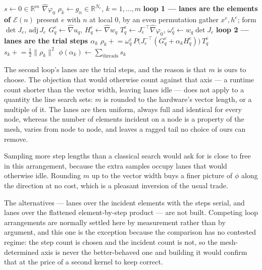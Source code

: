 \documentclass[11pt]{article}
\newcommand{\R}{\mathbb{R}}
\begin{document}
\begin{algorithm}
\caption{Residual merit at $m$ trial steps: one node, two vector loops}
\label{alg:kernel}
\begin{algorithmic}[1]
\State $s \gets 0 \in \R^{m}$ 
\State $\widehat\nabla\varphi_0$ 
  \State $\rho_k \gets g_n \in \R^{N_c}$, $k=1,\dots,m$ 
  \Statex \textbf{loop 1 --- lanes are the elements of $\mathcal{E}(n)$}
    \State present $e$ with $n$ at local $0$, by an even permutation
    \State gather $x^e,h^e$; form $\det J_e$, $\mathrm{adj}\,J_e$
      \State $G^e_q \gets \widehat\nabla u_q$, \; $H^e_q \gets \widehat\nabla w_q$
      \State $T^e_q \gets J_e^{-\top}\widehat\nabla\varphi_0$, \;
             $\omega^e_q \gets w_q \det J_e$
    \EndFor
  \EndFor
  \Statex \textbf{loop 2 --- lanes are the trial steps $\alpha_k$}
      \State $\rho_k \mathrel{+}= \omega^e_q \,
             P\bigl(J_e^{-\top}(G^e_q + \alpha_k H^e_q)\bigr)\, T^e_q$
    \EndFor
    \State $s_k \mathrel{+}= \tfrac12 \|\rho_k\|^2$ 
  \EndFor
\EndFor
\State $\phi(\alpha_k) \gets \sum_{\text{threads}} s_k$
\end{algorithmic}
\end{algorithm}

The second loop's lanes are the trial steps, and the reason is that $m$ is ours
to choose.  The objection that would otherwise count against that axis --- a
runtime count shorter than the vector width, leaving lanes idle --- does not
apply to a quantity the line search sets: $m$ is rounded to the hardware's
vector length, or a multiple of it.  The lanes are then uniform, always full and
identical for every node, whereas the number of elements incident on a node is a
property of the mesh, varies from node to node, and leaves a ragged tail no
choice of ours can remove.

Sampling more step lengths than a classical search would ask for is close to
free in this arrangement, because the extra samples occupy lanes that would
otherwise idle.  Rounding $m$ up to the vector width buys a finer picture of
$\phi$ along the direction at no cost, which is a pleasant inversion of the
usual trade.

The alternatives --- lanes over the incident elements with the steps serial, and
lanes over the flattened element-by-step product --- are not built.  Competing
loop arrangements are normally settled here by measurement rather than by
argument, and this one is the exception because the comparison has no contested
regime: the step count is chosen and the incident count is not, so the
mesh-determined axis is never the better-behaved one and building it would
confirm that at the price of a second kernel to keep correct.
\end{document}
